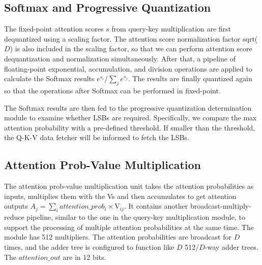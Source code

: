 \subsection{Softmax and Progressive Quantization}
The fixed-point attention scores $s$ from query-key multiplication are first dequantized using a scaling factor. The attention score normalization factor sqrt($D$) is also included in the scaling factor, so that we can perform attention score dequantization and normalization simultaneously. After that, a pipeline of floating-point exponential, accumulation, and division operations are applied to calculate the Softmax results $e^{s_i}/\sum_j e^{s_j}$. The results are finally quantized again so that the operations after Softmax can be performed in fixed-point.

The Softmax results are then fed to the progressive quantization determination module to examine whether LSBs are required. Specifically, we compare the max attention probability with a pre-defined threshold. If smaller than the threshold, the Q-K-V data fetcher will be informed to fetch the LSBs.

\subsection{Attention Prob-Value Multiplication}
The attention prob-value multiplication unit takes the attention probabilities as inputs, multiplies them with the Vs and then accumulates to get attention outputs $A_j = \sum_i attention\_prob_i \times \mathrm{V}_{ij}$. It contains another broadcast-multiply-reduce pipeline, similar to the one in the query-key multiplication module, to support the processing of multiple attention probabilities at the same time. The module has 512 multipliers. The attention probabilities are broadcast for $D$ times, and the adder tree is configured to function like $D$ 512/$D$-way adder trees. The $attention\_out$ are in 12 bits.




